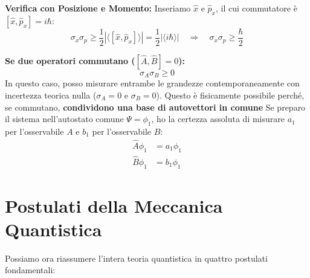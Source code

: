 \documentclass[11pt, a4paper]{article}
\begin{document}
\noindent
\textbf{Verifica con Posizione e Momento:} %
Inseriamo $\hat{x}$ e $\hat{p}_x$, il cui commutatore è $[\hat{x}, \hat{p}_x] = i\hbar$: %
\begin{equation*}
    \sigma_x \sigma_p \ge \frac{1}{2} | \langle [\hat{x}, \hat{p}_x] \rangle | = \frac{1}{2} | \langle i\hbar \rangle | \quad \Rightarrow \quad \boxed{ \sigma_x \sigma_p \ge \frac{\hbar}{2} } %
\end{equation*}

\noindent
\textbf{Se due operatori commutano ($[\hat{A}, \hat{B}] = 0$):} %
\begin{equation*}
    \sigma_A \sigma_B \ge 0 %
\end{equation*}
In questo caso, posso misurare entrambe le grandezze contemporaneamente con incertezza teorica nulla ($\sigma_A=0$ e $\sigma_B=0$). Questo è fisicamente possibile perché, se commutano, \textbf{condividono una base di autovettori in comune} %
Se preparo il sistema nell'autostato comune $\Psi = \phi_1$, ho la certezza assoluta di misurare $a_1$ per l'osservabile $A$ e $b_1$ per l'osservabile $B$: %
\begin{align*}
    \hat{A} \phi_1 &= a_1 \phi_1 \\ %
    \hat{B} \phi_1 &= b_1 \phi_1 %
\end{align*}

\section{Postulati della Meccanica Quantistica} %

Possiamo ora riassumere l'intera teoria quantistica in quattro postulati fondamentali: %
\end{document}
